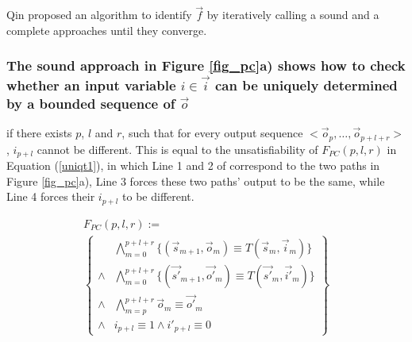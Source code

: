 \documentclass[conference]{IEEEtran}
\begin{document}
Qin \cite{QinTODAES15} proposed an algorithm
to identify $\vec{f}$ by iteratively calling 
a sound and a complete approaches until they converge.

\subsubsection{The sound approach in Figure \ref{fig_pc}a) shows how to check whether
an input variable $i\in\vec{i}$ can be uniquely determined by a bounded sequence of $\vec{o}$}\label{subsub_sound}
if there exists $p$, $l$ and $r$,
such that for every output sequence $<\vec{o}_p,\dots,\vec{o}_{p+l+r}>$,
$i_{p+l}$ cannot be different.
This is equal to the unsatisfiability of $F_{PC}(p,l,r)$ in Equation (\ref{uniqt1}),
in which Line 1 and 2 of correspond to the two paths in Figure \ref{fig_pc}a),
Line 3 forces these two paths' output to be the same,
while Line 4 forces their $i_{p+l}$ to be different.


\begin{multline}\label{uniqt1}
F_{PC}(p,l,r):= \\
\left\{
\begin{array}{cc}
&\bigwedge_{m=0}^{p+l+r}
\{
(\vec{s}_{m+1},\vec{o}_m)\equiv T(\vec{s}_m,\vec{i}_m)
\}
\\
\wedge&\bigwedge_{m=0}^{p+l+r}
\{
(\vec{s'}_{m+1},\vec{o'}_m)\equiv T(\vec{s'}_m,\vec{i'}_m)
\}
\\
\wedge&\bigwedge_{m=p}^{p+l+r}\vec{o}_m\equiv \vec{o'}_m \\
\wedge& i_{p+l}\equiv 1 \wedge  i'_{p+l}\equiv 0 
\end{array}
\right\}
\end{multline}




\end{document}
